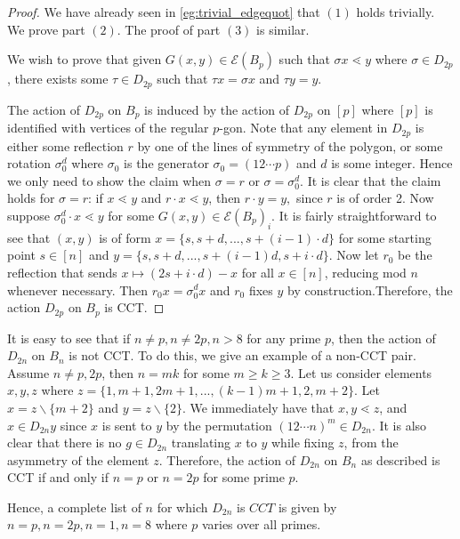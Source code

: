 \documentclass[smallextended]{svjour3}       %
\numberwithin{equation}{section}
\begin{document}
\building*

\begin{proof}
We have already seen in \ref{eg:trivial_edgequot} that $(1)$ holds trivially. We prove part $(2)$. The proof of part $(3)$ is similar. 

We wish to prove that given $G(x, y) \in \mathcal E (B_p)$ such that $\sigma x \lessdot y$ where $\sigma \in D_{2p}$, there exists some $\tau \in D_{2p}$ such that $\tau x = \sigma x$ and $\tau y = y$. 

The action of $D_{2p}$ on $B_p$ is induced by the action of $D_{2p}$ on $[p]$ where $[p]$ is identified with vertices of the regular $p$-gon. Note that any element in $D_{2p}$ is either some reflection $r$ by one of the lines of symmetry of the polygon, or some rotation $\sigma_0^{d} $ where $\sigma_0$ is the generator $\sigma_0 = (12 \cdots p)$ and $d$ is some integer. Hence we only need to show the claim when $\sigma = r$ or $\sigma = \sigma_0^d$. It is clear that the claim holds for $\sigma = r$: if $x \lessdot y$ and $r \cdot x \lessdot y$, then $r \cdot y = y,$ since $r$ is of order 2. Now suppose $\sigma_0^d \cdot x \lessdot y$ for some $G(x,y) \in \mathcal E(B_p)_i$.  It is fairly straightforward to see that $(x, y)$ is of form $x = \{s, s+d, ..., s+(i-1)\cdot d\}$ for some starting point $s \in [n]$ and $y = \{s, s+d, ..., s+(i-1)d, s + i \cdot d\}$. Now let $r_0$ be the reflection that sends $x \mapsto (2s+ i \cdot d)-x$ for all $x \in [n]$, reducing mod $n$ whenever necessary. Then $r_0 x = \sigma_0^d x$ and $r_0$ fixes $y$ by construction.Therefore, the action $D_{2p}$ on $B_p$ is CCT. 
\end{proof}


\begin{remark}
\label{prop:iff_dihedral_cct}
It is easy to see that if $n \neq p,n \neq 2p, n >8$ for any prime $p$, then the action of $D_{2n}$ on $B_n$ is not CCT. To do this, we give an example of a non-CCT pair. Assume $n \ne p, 2 p$, then $n = mk$ for some $m \ge k \ge 3$. Let us consider elements $x, y, z$ where $z = \{1, m+1, 2m+1, ..., (k-1)m+1, 2, m+2\}$. Let $x = z \backslash \{m+2\}$ and $y = z \backslash \{2\}$. We immediately have that $x, y \lessdot z$, and $x \in D_{2n} y$ since $x$ is sent to $y$ by the permutation $(12\cdots n)^m \in D_{2n}$. It is also clear that there is no $g \in D_{2n}$ translating $x$ to $y$ while fixing $z$, from the asymmetry of the element $z$. Therefore, the action of $D_{2n}$ on $B_n$ as described is CCT if and only if $n =p$ or $n = 2p$ for some prime $p$.

Hence, a complete list of $n$ for which $D_{2n}$ is $CCT$ is given by $n = p,n = 2p, n = 1, n = 8$ where $p$ varies over all primes.
\end{remark}
\end{document}
